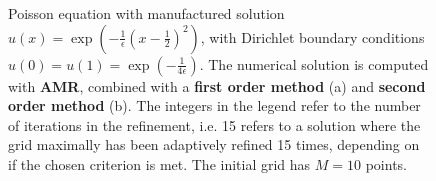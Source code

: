\begin{figure}
\centering
{}\hspace{0mm}
\hspace{0mm}
\caption{Poisson equation with manufactured solution $u(x) = \exp{\left(-\frac{1}{\epsilon}(x-\frac{1}{2})^2\right)}$, with Dirichlet boundary conditions $u(0) = u(1) = \exp{\left(-\frac{1}{4\epsilon}\right)}$.  The numerical solution is computed with \textbf{AMR}, combined with a  \textbf{first order method} (a) and \textbf{second order method} (b). The integers in the legend refer to the number of iterations in the refinement, i.e. 15 refers to a solution where the grid maximally has been adaptively refined 15 times, depending on if the chosen criterion is met. The initial grid  has $M = 10$ points.}
\label{fig:part1Task1dSolutionAMR}
\end{figure}

